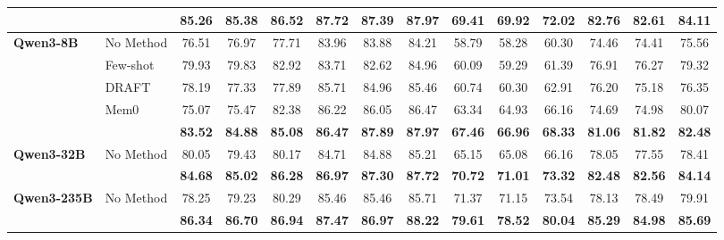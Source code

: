 \begin{table}[t]
{\begin{tabular}{llcccccccccccc}
        & \cellcolor{gray!15}{\ours} & \cellcolor{gray!15}\textbf{85.26} & \cellcolor{gray!15}\textbf{85.38} & \cellcolor{gray!15}\textbf{86.52} & \cellcolor{gray!15}\textbf{87.72} & \cellcolor{gray!15}\textbf{87.39} & \cellcolor{gray!15}\textbf{87.97} & \cellcolor{gray!15}\textbf{69.41} & \cellcolor{gray!15}\textbf{69.92} & \cellcolor{gray!15}\textbf{72.02} & \cellcolor{gray!15}\textbf{82.76} & \cellcolor{gray!15}\textbf{82.61} & \cellcolor{gray!15}\textbf{84.11} \\
    \midrule
    \multirow{5}{*}{\textbf{Qwen3-8B}}
        & No Method & 76.51 & 76.97 & 77.71 & 83.96 & 83.88 & 84.21 & 58.79 & 58.28 & 60.30 & 74.46 & 74.41 & 75.56 \\
        & Few-shot  & 79.93 & 79.83 & 82.92 & 83.71 & 82.62 & 84.96 & 60.09 & 59.29 & 61.39 & 76.91 & 76.27 & 79.32 \\
        & DRAFT     & 78.19 & 77.33 & 77.89 & 85.71 & 84.96 & 85.46 & 60.74 & 60.30 & 62.91 & 76.20 & 75.18 & 76.35 \\
        & Mem0      & 75.07 & 75.47 & 82.38 & 86.22 & 86.05 & 86.47 & 63.34 & 64.93 & 66.16 & 74.69 & 74.98 & 80.07 \\
        & \cellcolor{gray!15}{\ours} & \cellcolor{gray!15}\textbf{83.52} & \cellcolor{gray!15}\textbf{84.88} & \cellcolor{gray!15}\textbf{85.08} & \cellcolor{gray!15}\textbf{86.47} & \cellcolor{gray!15}\textbf{87.89} & \cellcolor{gray!15}\textbf{87.97} & \cellcolor{gray!15}\textbf{67.46} & \cellcolor{gray!15}\textbf{66.96} & \cellcolor{gray!15}\textbf{68.33} & \cellcolor{gray!15}\textbf{81.06} & \cellcolor{gray!15}\textbf{81.82} & \cellcolor{gray!15}\textbf{82.48} \\
    \midrule
    \multirow{2}{*}{\textbf{Qwen3-32B}}
        & No Method & 80.05 & 79.43 & 80.17 & 84.71 & 84.88 & 85.21 & 65.15 & 65.08 & 66.16 & 78.05 & 77.55 & 78.41 \\
        & \cellcolor{gray!15}{\ours} & \cellcolor{gray!15}\textbf{84.68} & \cellcolor{gray!15}\textbf{85.02} & \cellcolor{gray!15}\textbf{86.28} & \cellcolor{gray!15}\textbf{86.97} & \cellcolor{gray!15}\textbf{87.30} & \cellcolor{gray!15}\textbf{87.72} & \cellcolor{gray!15}\textbf{70.72} & \cellcolor{gray!15}\textbf{71.01} & \cellcolor{gray!15}\textbf{73.32} & \cellcolor{gray!15}\textbf{82.48} & \cellcolor{gray!15}\textbf{82.56} & \cellcolor{gray!15}\textbf{84.14} \\
    \midrule
    \multirow{2}{*}{\textbf{Qwen3-235B}}
        & No Method & 78.25 & 79.23 & 80.29 & 85.46 & 85.46 & 85.71 & 71.37 & 71.15 & 73.54 & 78.13 & 78.49 & 79.91 \\
        & \cellcolor{gray!15}{\ours} & \cellcolor{gray!15}\textbf{86.34} & \cellcolor{gray!15}\textbf{86.70} & \cellcolor{gray!15}\textbf{86.94} & \cellcolor{gray!15}\textbf{87.47} & \cellcolor{gray!15}\textbf{86.97} & \cellcolor{gray!15}\textbf{88.22} & \cellcolor{gray!15}\textbf{79.61} & \cellcolor{gray!15}\textbf{78.52} & \cellcolor{gray!15}\textbf{80.04} & \cellcolor{gray!15}\textbf{85.29} & \cellcolor{gray!15}\textbf{84.98} & \cellcolor{gray!15}\textbf{85.69} \\
    \bottomrule
    \end{tabular}
    }
    \label{tab:main}
\end{table}
